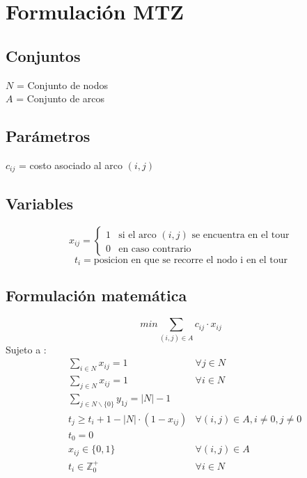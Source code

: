 \documentclass{article}
\numberwithin{equation}{section}
\begin{document}
\section{Formulación MTZ}
\subsection{Conjuntos}
$N$ = Conjunto de nodos\\
$A$ = Conjunto de arcos
\subsection{Parámetros}
$c_{ij}$ = costo asociado al arco $(i,j)$
\subsection{Variables}
\begin{flushleft}
\[x_{ij}={\begin{cases}1&{\mbox{si el arco $(i,j)$ se encuentra en el tour}}\\0&{\mbox{en caso contrario}}\end{cases}}
\]
\[t_{i} = \mbox{posicion en que se recorre el nodo i en el tour}\]
\end{flushleft}
\subsection{Formulación matemática}
\begin{equation}
min \sum_{(i,j) \in A} c_{ij} \cdot x_{ij}
\end{equation}
Sujeto a : \begin{align}
& \sum_{i \in N} x_{ij} = 1 &\forall j \in N \\
& \sum_{j \in N} x_{ij} = 1 &\forall i \in N \\
& \sum_{j \in N \backslash \{0\}} y_{1j} = |N| - 	1 \\
& t_{j} \geq t_{i} + 1 - |N| \cdot (1 - x_{ij}) & \forall (i,j) \in A, i \neq 0, j \neq 0\\
& t_{0} = 0\\
& x_{ij} \in \{0,1\} &\forall (i,j) \in A\\
& t_{i} \in \mathbb{Z}^{+}_{0} &\forall i \in N
\end{align}
\end{document}
